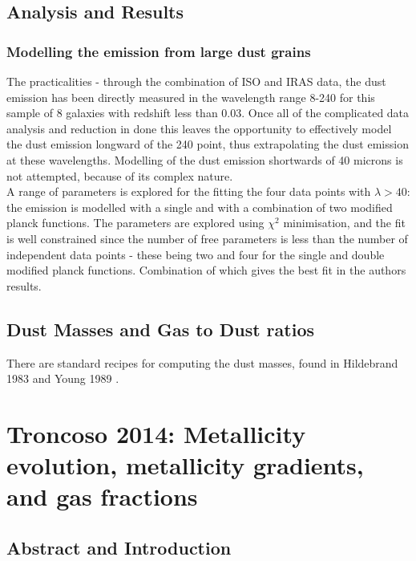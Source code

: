 \documentclass{literature}
\begin{document}
\subsection{Analysis and Results}
\subsubsection{Modelling the emission from large dust grains}
The practicalities - through the combination of ISO and IRAS data, the dust emission has been directly measured in the wavelength range 8-240 for this sample of 8 galaxies with redshift less than 0.03. Once all of the complicated data analysis and reduction in done this leaves the opportunity to effectively model the dust emission longward of the 240 point, thus extrapolating the dust emission at these wavelengths. Modelling of the dust emission shortwards of 40 microns is not attempted, because of its complex nature. \\ 
A range of parameters is explored for the fitting the four data points with $\lambda > 40$: the emission is modelled with a single and with a combination of two modified planck functions. The parameters are explored using $\chi ^{2}$ minimisation, and the fit is well constrained since the number of free parameters is less than the number of independent data points - these being two and four for the single and double modified planck functions. Combination of which gives the best fit in the authors results. 

\subsection{Dust Masses and Gas to Dust ratios}
There are standard recipes for computing the dust masses, found in Hildebrand 1983 \citep{Hildebrand1983} and Young 1989 \citep{Young1989}.  


\section{Troncoso 2014: Metallicity evolution, metallicity gradients, and gas fractions}\label{sec:Tronc}
\subsection{Abstract and Introduction}
\end{document}
